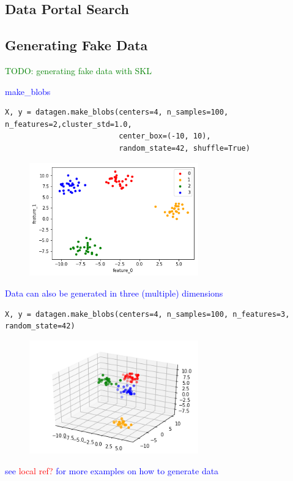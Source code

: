 \subsection{Data Portal Search}

\subsection{Generating Fake Data}

\textcolor{green}{TODO: generating fake data with SKL}

\textcolor{blue}{make\_blobs}

\begin{lstlisting}[style=pyInStyle]
X, y = datagen.make_blobs(centers=4, n_samples=100, n_features=2,cluster_std=1.0,
                          center_box=(-10, 10),
                          random_state=42, shuffle=True)
\end{lstlisting}

\begin{figure}
\centering
\includegraphics[width=0.65\textwidth]{./sync_imgs/datagen/blobs/2dimg.png}
\label{fig:datagen_blobs_2dimg}
\end{figure}

\textcolor{blue}{Data can also be generated in three (multiple) dimensions}

\begin{lstlisting}[style=pyInStyle]
X, y = datagen.make_blobs(centers=4, n_samples=100, n_features=3, random_state=42)
\end{lstlisting}

\begin{figure}
\centering
\includegraphics[width=0.65\textwidth]{./sync_imgs/datagen/blobs/3dimg.png}
\label{fig:datagen_blobs_3dimg}
\end{figure}



\textcolor{blue}{see \textcolor{red}{local ref?} for more examples on how to generate data}
